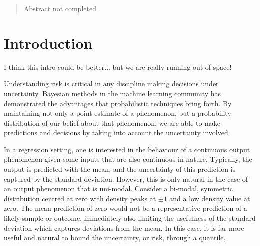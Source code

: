 \documentclass[twoside]{article} \usepackage{aistats2017}
\theoremstyle{definition}
\theoremstyle{theorem}
\newcommand{\warn}[1]{{\color{red} #1}}
\begin{document}
%

%


\begin{abstract}

	\warn{Abstract not completed}
	
\end{abstract}

\section{Introduction}
\label{sec:introduction}
	
	\warn{I think this intro could be better... but we are really running out of space!}

	Understanding risk is critical in any discipline making decisions under uncertainty. Bayesian methods in the machine learning community has demonstrated the advantages that probabilistic techniques bring forth. By maintaining not only a point estimate of a phenomenon, but a probability distribution of our belief about that phenomenon, we are able to make predictions and decisions by taking into account the uncertainty involved.
	
	In a regression setting, one is interested in the behaviour of a continuous output phenomenon given some inputs that are also continuous in nature. Typically, the output is predicted with the mean, and the uncertainty of this prediction is captured by the standard deviation. However, this is only natural in the case of an output phenomenon that is uni-modal. Consider a bi-modal, symmetric distribution centred at zero with density peaks at $\pm1$ and a low density value at zero. The mean prediction of zero would not be a representative prediction of a likely sample or outcome, immediately also limiting the usefulness of the standard deviation which captures deviations from the mean. In this case, it is far more useful and natural to bound the uncertainty, or risk, through a quantile.
	
\end{document}
